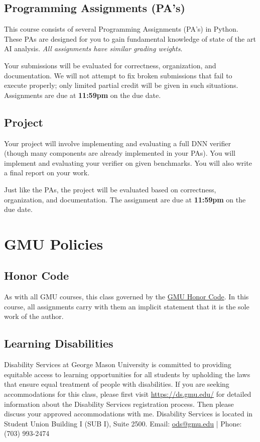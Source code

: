 \documentclass[11pt]{article}
\begin{document}
\subsection{Programming Assignments (PA's)}

This course consists of several Programming Assignments (PA's) in Python. These PAs are designed for you to gain fundamental knowledge of state of the art AI analysis. \emph{All assignments have similar grading weights}.

Your submissions will be evaluated for correctness,
organization, and documentation. We will not attempt to fix broken
submissions that fail to execute properly; only limited partial credit will be given in such situations. Assignments are due at \textbf{11:59pm} on the due date.

\subsection{Project}

Your project will involve implementing and evaluating a full DNN verifier (though many components are already implemented in your PAs). You will implement and evaluating your verifier on given benchmarks. You will also write a final report on your work.

Just like the PAs, the project will be evaluated based on correctness, organization, and documentation. The assignment are due at \textbf{11:59pm} on the due date.

\newpage
\section{GMU Policies}
\subsection{Honor Code}\label{sec:honor-code}

As with all GMU courses, this class governed by the \href{https://academicstandards.gmu.edu}{GMU Honor Code}. In this course, all assignments carry with them an implicit statement that it is the sole work of the author.

\subsection{Learning Disabilities}

Disability Services at George Mason University is committed to providing equitable access to learning opportunities for all students by upholding the laws that ensure equal treatment of people with disabilities. If you are seeking accommodations for this class, please first visit \url{https://ds.gmu.edu/} for detailed information about the Disability Services registration process. Then please discuss your approved accommodations with me. Disability Services is located in Student Union Building I (SUB I), Suite 2500. Email: \href{mailto:ods@gmu.edu}{ods@gmu.edu} | Phone: (703) 993-2474
\end{document}
